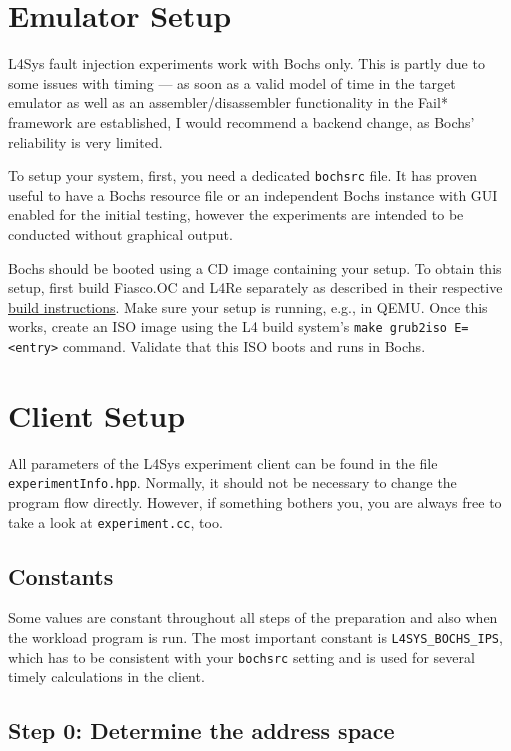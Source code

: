 \documentclass[a4paper,10pt]{article}
\begin{document}
\section{Emulator Setup}

L4Sys fault injection experiments work with Bochs only. This is partly due to
some issues with timing --- as soon as a valid model of time in the target
emulator as well as an assembler/disassembler functionality in the Fail*
framework are established, I would recommend a backend change, as Bochs'
reliability is very limited.

To setup your system, first, you need a dedicated \texttt{bochsrc} file.  It
has proven useful to have a Bochs resource file or an independent Bochs
instance with GUI enabled for the initial testing, however the experiments are
intended to be conducted without graphical output.

Bochs should be booted using a CD image containing your setup. To obtain this
setup, first build Fiasco.OC and L4Re separately as described in their
respective \href{https://os.inf.tu-dresden.de/L4Re/build.html}{build
instructions}. Make sure your setup is running, e.g., in QEMU. Once this
works, create an ISO image using the L4 build system's 
\verb+make grub2iso E=<entry>+ command. Validate that this ISO boots and runs
in Bochs.

\section{Client Setup}

All parameters of the L4Sys experiment client can be found in the file
\texttt{experimentInfo.hpp}. Normally, it should not be necessary to change
the program flow directly. However, if something bothers you, you are always
free to take a look at \texttt{experiment.cc}, too.

\subsection{Constants}

Some values are constant throughout all steps of the preparation and also when
the workload program is run.  The most important constant is
\verb+L4SYS_BOCHS_IPS+, which has to be consistent with your \texttt{bochsrc}
setting and is used for several timely calculations in the client.

\subsection{Step 0: Determine the address space}
\end{document}
